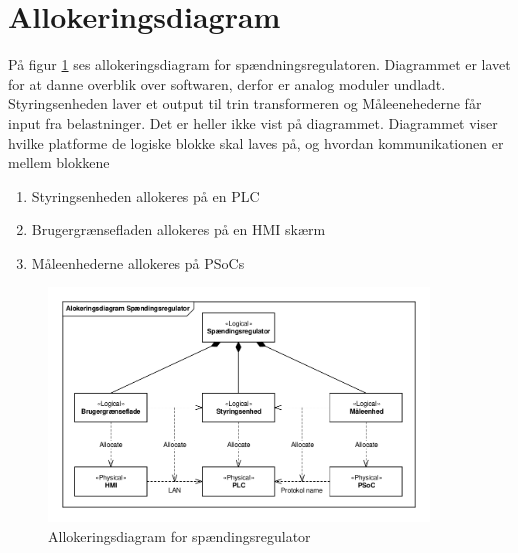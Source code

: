 
\section{Allokeringsdiagram}
På figur \ref{fig:Allokering} ses allokeringsdiagram for spændningsregulatoren. Diagrammet er lavet for at danne overblik over softwaren, derfor er analog moduler undladt. Styringsenheden laver et output til trin transformeren og Måleenehederne får input fra belastninger. Det er heller ikke vist på diagrammet. Diagrammet viser hvilke platforme de logiske blokke skal laves på, og hvordan kommunikationen er mellem blokkene

\begin{enumerate}
	\item Styringsenheden allokeres på en PLC
	\item Brugergrænsefladen allokeres på en HMI skærm
	\item Måleenhederne allokeres på PSoCs
\end{enumerate}   

\begin{figure}[htbp] %
	\centering
	\includegraphics[width=0.9\textwidth]{Figure/Allokering}
	\caption{Allokeringsdiagram for spændingsregulator}
	\label{fig:Allokering}
\end{figure}